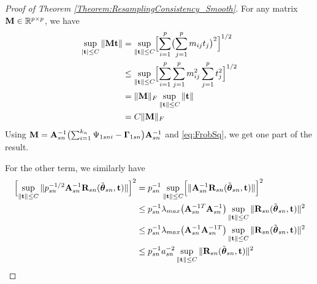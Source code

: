 \begin{proof}[Proof of Theorem \ref{Theorem:ResamplingConsistency_Smooth}]
For any matrix ${\mathbf{M}} \in {\mathbb{R}}^{p \times p}$, we have
%
\begin{align} 
\sup_{ | {\bf{t}}| \leq C} \| {\mathbf{M}} {\bf{t}} \| 
& = \sup_{ \| {\bf{t}} \| \leq C} 
\Bigl[ \sum_{i =1}^{p} \bigl( \sum_{j =1}^{p} m_{ i j} t_{j} \bigr)^{2} \Bigr]^{1/2} \notag\\
& \leq \sup_{ \| {\bf{t}} \| \leq C} 
\Bigl[ \sum_{i =1}^{p} \sum_{j =1}^{p} m_{ i j}^{2} 
\sum_{j =1}^{p} t_{j}^{2} \Bigr]^{1/2} \notag\\
& = \| {\mathbf{M}} \|_{F} \sup_{ \| {\bf{t}} \| \leq C} \|{\bf{t}} \| \notag\\
& = C \| {\mathbf{M}} \|_{F}
\end{align}
%
Using ${\mathbf{M}} =  {\mathbf{A}}_{ s n}^{-1}  \bigl( \sum_{i = 1}^{ k_{n}} \Psi_{1 s n i} - {\boldsymbol{\Gamma}}_{1 s n } \bigr) {\mathbf{A}}_{ s n}^{-1}$ and \ref{eq:FrobSq}, we get one part of the result.

For the other term, we similarly have 
%
\begin{align} 
\Bigl[ \sup_{ \| {\bf{t}} \| \leq C} \| 
p_{s n}^{-1/2}  {\mathbf{A}}_{ s n}^{-1} {\mathbf{R}}_{ s n} (\tilde{{\boldsymbol{\theta}}}_{s n },  {\bf{t}})
\| \Bigr]^{2} & = p_{s n}^{-1} \sup_{ \| {\bf{t}} \| \leq C} 
\Bigl[ \|  {\mathbf{A}}_{ s n}^{-1} {\mathbf{R}}_{ s n} (\tilde{{\boldsymbol{\theta}}}_{s n },  {\bf{t}})
\| \Bigr]^{2} \notag\\
& \leq p_{s n}^{-1} \lambda_{max}\bigl( {\mathbf{A}}_{ s n}^{-1T} {\mathbf{A}}_{ s n}^{-1}  \bigr)
\sup_{ \| {\bf{t}} \| \leq C} \| {\mathbf{R}}_{ s n} (\tilde{{\boldsymbol{\theta}}}_{s n },  {\bf{t}})\|^{2} \notag\\
& \leq p_{s n}^{-1} \lambda_{max}\bigl( {\mathbf{A}}_{ s n}^{-1} {\mathbf{A}}_{ s n}^{-1T}  \bigr)
\sup_{ \| {\bf{t}} \| \leq C} \| {\mathbf{R}}_{ s n} (\tilde{{\boldsymbol{\theta}}}_{s n },  {\bf{t}})\|^{2} \notag\\
& \leq p_{s n}^{-1} a_{s n}^{-2} 
\sup_{ \| {\bf{t}} \| \leq C} \| {\mathbf{R}}_{ s n} (\tilde{{\boldsymbol{\theta}}}_{s n },  {\bf{t}})\|^{2}
\end{align}



\end{proof}
